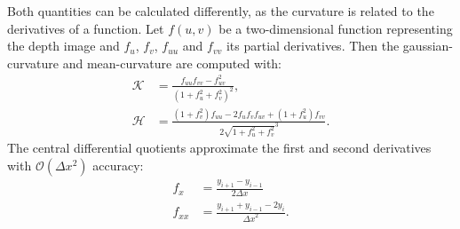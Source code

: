 Both quantities can be calculated differently, as the \gls{curvature} is related to the derivatives of a function.
Let $f(u, v)$ be a two-dimensional function representing the depth image and $f_u$, $f_v$, $f_{uu}$ and $f_{vv}$ its partial derivatives.
Then the \gls{gaussian-curvature} and \gls{mean-curvature} are computed with:
\begin{equation}
\begin{aligned}
    \mathcal{K} &= \frac{f_{uu} f_{vv} - f_{uv}^2}{{(1 + f_u^2 + f_v^2)}^2}\text{,} \\
    \mathcal{H} &= \frac{{(1 + f_{v}^2)} f_{uu} - 2 f_u f_v f_{uv} + {(1 + f_u^2)} f_{vv}}{2 \sqrt{1 + f_u^2 + f_v^2}^3}\text{.}
\end{aligned}
\end{equation}
The central differential quotients approximate the first and second derivatives with $\mathcal{O}(\Delta x^2)$ accuracy:
\begin{equation}
\begin{aligned}
    f_{x} &= \frac{y_{i+1} - y_{i-1}}{2 \Delta x} \\
    f_{xx} &= \frac{y_{i+1} + y_{i-1} - 2 y_{i}}{{\Delta x}^2}\text{.}
\end{aligned}
\end{equation}


